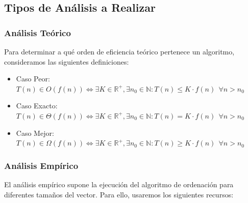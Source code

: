 \documentclass[a4paper,12pt,twoside]{article} %
\begin{document}
\subsection{Tipos de Análisis a Realizar}

\subsubsection{Análisis Teórico}

Para determinar a qué orden de eficiencia teórico pertenece un algoritmo, consideramos las siguientes definiciones:

\begin{itemize}

	\item Caso Peor:\\
	\begin{math}
	T(n) \in O(f(n)) \Leftrightarrow \exists K \in \mathbb{R^+} , \exists n_0 \in \mathbb{N} : T(n) \leq K \cdot{f(n)} \ \ \forall n > n_0
	\end{math}
	
	\item Caso Exacto:\\
	\begin{math}	
	T(n) \in \Theta(f(n)) \Leftrightarrow \exists K \in \mathbb{R^+} , \exists n_0 \in \mathbb{N} : T(n) = K \cdot{f(n)} \ \ \forall n > n_0
	\end{math}
	
	\item Caso Mejor:\\
	\begin{math}
	T(n) \in \Omega(f(n)) \Leftrightarrow \exists K \in \mathbb{R^+} , \exists n_0 \in \mathbb{N} : T(n) \geq K \cdot{f(n)} \ \ \forall n > n_0
	\end{math}
	
\end{itemize}

\vspace{1cm}




\newpage
\subsubsection{Análisis Empírico}

El análisis empírico supone la ejecución del algoritmo de ordenación para diferentes tamaños del vector. Para ello, usaremos los siguientes recursos:\\
\end{document}
